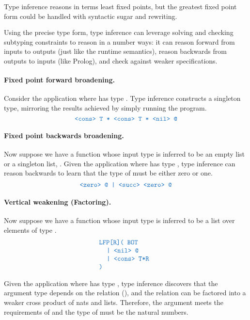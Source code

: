 \documentclass[acmsmall]{acmart}
\theoremstyle{definition}
\begin{document}
Type inference reasons in terms least fixed points, but the greatest fixed point form could
be handled with syntactic sugar and rewriting.  

Using the precise type form, type inference can leverage solving and checking subtyping constraints 
to reason in a number ways: it can reason forward from inputs to outputs (just like the runtime semantics), 
reason backwards from outputs to inputs (like Prolog), and check against weaker specifications. 


\paragraph{Fixed point forward broadening.} Consider the application  where 
has type . Type inference
constructs a singleton type, mirroring the results achieved by simply running the program.  
\[
  \obj{<cons> T * <cons> T * <nil> @}
\]

\paragraph{Fixed point backwards broadening.} Now suppose we have a function  whose input
type is inferred to be an empty list or a singleton list, .
Given the application  where  has type , type inference can reason backwards to learn
that the type of  must be either zero or one. 
\[
  \obj{<zero> @ | <succ> <zero> @}
\]



\paragraph{Vertical weakening (Factoring).} 
Now suppose we have a function  whose input
type is inferred to be a list over elements of type .
\[
  \begin{array}[t]{@{} l}
      \obj{LFP[R]( BOT}
      \\
      \I \obj{| <nil> @ }
      \\
      \I \obj{| <cons> T*R}
      \\
      \obj{)}
  \end{array}
\]

Given the application  where  has type , type 
inference discovers that the argument type depends on the relation (), 
and the relation can be factored into a weaker cross product of nats and lists. 
Therefore, the argument meets the requirements
of  and the type of  must be the natural numbers.
\end{document}
